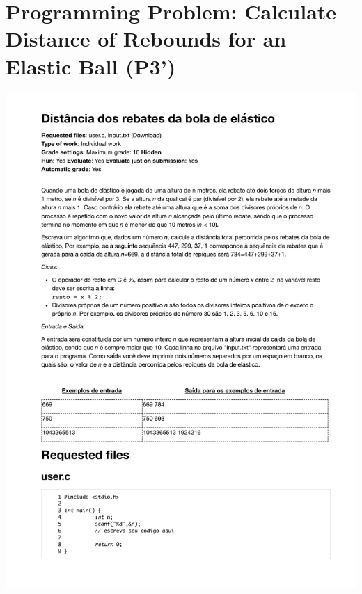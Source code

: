 \section{Programming Problem: Calculate Distance of Rebounds for an Elastic Ball (P3')}
\label{annex:pilot-study-p3}
\includegraphics[page=1,width=1\textwidth]{images/annex/pilot-study-p3.pdf}

\newpage
